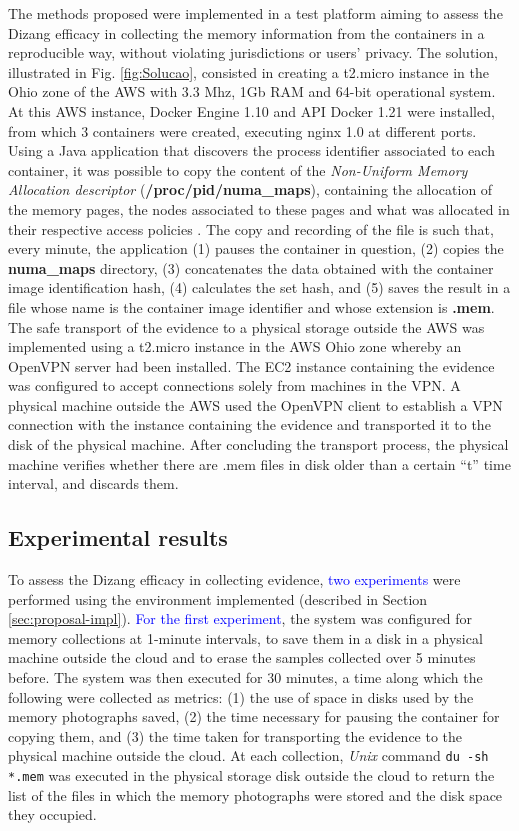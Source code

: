 \documentclass[conference]{IEEEtran}
\newcommand{\fancyname}{Dizang }
\begin{document}
The methods proposed were implemented in a test platform aiming to assess the \fancyname efficacy in collecting the memory information from the containers in a reproducible way, without violating jurisdictions or users’ privacy.
%
The solution, illustrated in Fig. \ref{fig:Solucao}, consisted in creating a t2.micro instance in the Ohio zone of the AWS with 3.3 Mhz, 1Gb RAM and 64-bit operational system. 
%
At this AWS instance, Docker Engine 1.10 and API Docker 1.21 were installed, from which 3 containers were created, executing nginx 1.0 at different ports. 
%
Using a Java application that discovers the process identifier associated to each container, it was possible to copy the content of the \textit{Non-Uniform Memory Allocation descriptor} (\textbf{/proc/pid/numa\_maps}), containing the allocation of the memory pages, the nodes associated to these pages and what was allocated in their respective access policies \cite{UnixManPages_numa_maps}.
%
The copy and recording of the file is such that, every minute, the application (1) pauses the container in question, (2) copies the \textbf{numa\_maps} directory, (3) concatenates the data obtained with the container image identification hash, (4) calculates the set hash, and (5) saves the result in a file whose name is the container image identifier and whose extension is \textbf{.mem}. 
%
The safe transport of the evidence to a physical storage outside the AWS was implemented using a t2.micro instance in the AWS Ohio zone whereby an OpenVPN server had been installed.
%
The EC2 instance containing the evidence was configured to accept connections solely from machines in the VPN.
%
A physical machine outside the AWS used the OpenVPN client to establish a VPN connection with the instance containing the evidence and transported it to the disk of the physical machine.
%
After concluding the transport process, the physical machine verifies whether there are .mem files in disk older than a certain “t” time interval, and discards them.
%

\subsection{Experimental results}
\label{sec:proposal-exp}

To assess the \fancyname efficacy in collecting evidence, \textcolor{blue}{two experiments} were performed using the environment implemented (described in Section \ref{sec:proposal-impl}).
%
\textcolor{blue}{For the first experiment}, the system was configured for memory collections at 1-minute intervals, to save them in a disk in a physical machine outside the cloud and to erase the samples collected over 5 minutes before. 
%
The system was then executed for 30 minutes, a time along which the following were collected as metrics: (1) the use of space in disks used by the memory photographs saved, (2) the time necessary for pausing the container for copying them, and (3) the time taken for transporting the evidence to the physical machine outside the cloud.
%
At each collection, \textit{Unix} command \texttt{du -sh *.mem} was executed in the physical storage disk outside the cloud to return the list of the files in which the memory photographs were stored and the disk space they occupied.
%
\end{document}
